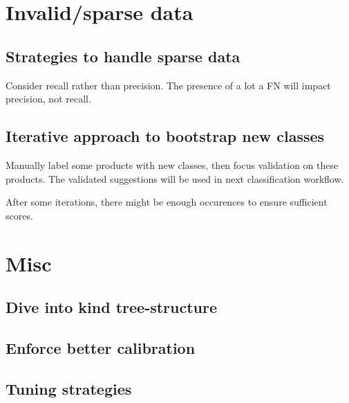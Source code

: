 \section{Invalid/sparse data}

\subsection{Strategies to handle sparse data}
Consider recall rather than precision. The presence of a lot a FN will impact precision, not recall.

\subsection{Iterative approach to bootstrap new classes}
Manually label some products with new classes, then focus validation on these products. The validated suggestions will be used in next classification workflow.

After some iterations, there might be enough occurences to ensure sufficient scores.


\section{Misc}

\subsection{Dive into kind tree-structure}
\subsection{Enforce better calibration}
\subsection{Tuning strategies}
